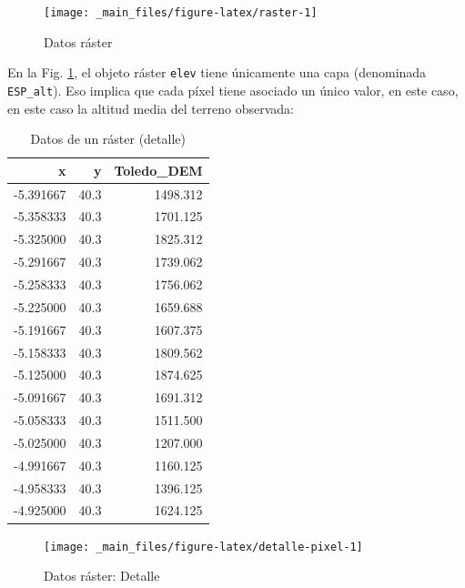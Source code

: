 \documentclass[
]{book}
\begin{document}
\begin{figure}

{\centering \texttt{[image: \_main\_files/figure-latex/raster-1]} 

}

\caption{Datos ráster}\label{fig:raster}
\end{figure}

En la Fig. \ref{fig:raster}, el objeto ráster \texttt{elev} tiene únicamente una capa
(denominada \texttt{ESP\_alt}). Eso implica que cada píxel tiene asociado un único
valor, en este caso, en este caso la altitud media del terreno observada:

\begin{table}

\caption{\label{tab:detalle-pixel}Datos de un ráster (detalle)}
\centering
\begin{tabular}[t]{r|r|r}
\hline
x & y & Toledo\_DEM\\
\hline
-5.391667 & 40.3 & 1498.312\\
\hline
-5.358333 & 40.3 & 1701.125\\
\hline
-5.325000 & 40.3 & 1825.312\\
\hline
-5.291667 & 40.3 & 1739.062\\
\hline
-5.258333 & 40.3 & 1756.062\\
\hline
-5.225000 & 40.3 & 1659.688\\
\hline
-5.191667 & 40.3 & 1607.375\\
\hline
-5.158333 & 40.3 & 1809.562\\
\hline
-5.125000 & 40.3 & 1874.625\\
\hline
-5.091667 & 40.3 & 1691.312\\
\hline
-5.058333 & 40.3 & 1511.500\\
\hline
-5.025000 & 40.3 & 1207.000\\
\hline
-4.991667 & 40.3 & 1160.125\\
\hline
-4.958333 & 40.3 & 1396.125\\
\hline
-4.925000 & 40.3 & 1624.125\\
\hline
\end{tabular}
\end{table}

\begin{figure}

{\centering \texttt{[image: \_main\_files/figure-latex/detalle-pixel-1]} 

}

\caption{Datos ráster: Detalle}\label{fig:detalle-pixel}
\end{figure}
\end{document}
